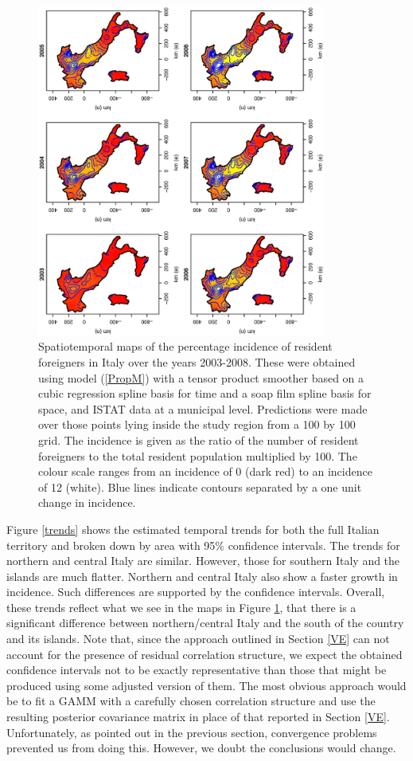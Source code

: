 \documentclass[12pt]{article}
\theoremstyle{definition}
\theoremstyle{plain}
\begin{document}
\begin{figure}[tbp]
	\centering
		\includegraphics[width=0.85\textwidth, angle=270]{maps-Soap.ps}
	\caption{Spatiotemporal maps of the percentage incidence of resident foreigners in Italy over the years 2003-2008. These were obtained using model (\ref{PropM}) with a tensor product smoother based on a cubic regression spline basis for time and a soap film spline basis for space, and ISTAT data at a municipal level. Predictions were made over those points lying inside the study region from a 100 by 100 grid. The incidence is given as the ratio of the number of resident foreigners to the total resident population multiplied by 100. The colour scale ranges from an incidence of 0 (dark red) to an incidence of 12 (white). Blue lines indicate contours separated by a one unit change in incidence.}
	\label{fig1}
\end{figure}

Figure \ref{trends} shows the estimated temporal trends for both the full Italian territory and broken down by area with 95\% confidence intervals. The trends for northern and central Italy are similar. However, those for southern Italy and the islands are much flatter. Northern and central Italy also show a faster growth in incidence. Such differences are supported by the confidence intervals. Overall, these trends reflect what we see in the maps in Figure \ref{fig1}, that there is a significant difference between northern/central Italy and the south of the country and its islands. Note that, since the approach outlined in Section \ref{VE} can not account for the presence of residual correlation structure, we expect the obtained confidence intervals not to be exactly representative than those that might be produced using some adjusted version of them. The most obvious approach would be to fit a GAMM with a carefully chosen correlation structure and use the resulting posterior covariance matrix in place of that reported in Section \ref{VE}. Unfortunately, as pointed out in the previous section, convergence problems prevented us from doing this. However, we doubt the conclusions would change.
\end{document}
